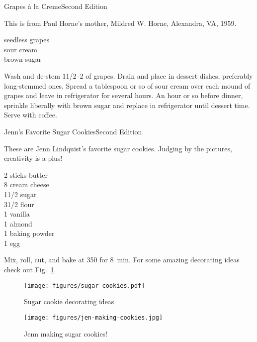 \begin{entry}{Grapes \`{a} la Creme}{Second Edition}

\begin{open}
    This is from Paul Horne's mother, Mildred W. Horne, Alexandra, VA, 1959.
\end{open}
\begin{ingredients}
    seedless grapes\\
    sour cream\\
    brown sugar
\end{ingredients}
Wash and de-stem 1\SIrange{1/2}{2}{\pound} of grapes. Drain and place in dessert
dishes, preferably long-stemmed ones.  Spread a tablespoon or so of sour cream
over each mound of grapes and leave in refrigerator for several hours.  An hour
or so before dinner, sprinkle liberally with brown sugar and replace in
refrigerator until dessert time.  Serve with coffee.
\end{entry}

\begin{entry}{Jenn's Favorite Sugar Cookies}{Second Edition}

\begin{open}
  These are Jenn Lindquist's favorite sugar cookies.  Judging by the pictures,
  creativity is a plus!
\end{open}
\begin{ingredients}
    2 sticks butter\\
    \SI{8}{\ounce} cream cheese\\
    1\SI{1/2}{\cup} sugar\\
    3\SI{1/2}{\cup} flour\\
    \SI{1}{\teaspoon} vanilla\\
    \SI{1}{\teaspoon} almond\\
    \SI{1}{\teaspoon} baking powder\\
    1 egg
\end{ingredients}
Mix, roll, cut, and bake at \SI{350}{\degreeF} for \SI{8}{\minute}.  For some
amazing decorating ideas check out Fig.~\ref{fig:sugar-cookie-decorating}.
\begin{figure}[h]
    \centering
    \texttt{[image: figures/sugar-cookies.pdf]}
    \caption{Sugar cookie decorating ideas}
    \label{fig:sugar-cookie-decorating}
\end{figure}
\begin{figure}[b]
    \centering
    \texttt{[image: figures/jen-making-cookies.jpg]}
    \caption{Jenn making sugar cookies!}
\end{figure}
\end{entry}

